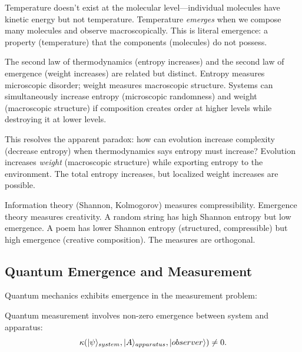\begin{interpretation}
Temperature doesn't exist at the molecular level---individual molecules have
kinetic energy but not temperature. Temperature \emph{emerges} when we compose
many molecules and observe macroscopically. This is literal emergence: a property
(temperature) that the components (molecules) do not possess.

The second law of thermodynamics (entropy increases) and the second law of
emergence (weight increases) are related but distinct. Entropy measures microscopic
disorder; weight measures macroscopic structure. Systems can simultaneously
increase entropy (microscopic randomness) and weight (macroscopic structure) if
composition creates order at higher levels while destroying it at lower levels.

This resolves the apparent paradox: how can evolution increase complexity
(decrease entropy) when thermodynamics says entropy must increase? Evolution
increases \emph{weight} (macroscopic structure) while exporting entropy to the
environment. The total entropy increases, but localized weight increases are
possible.

Information theory (Shannon, Kolmogorov) measures compressibility. Emergence
theory measures creativity. A random string has high Shannon entropy but low
emergence. A poem has lower Shannon entropy (structured, compressible) but high
emergence (creative composition). The measures are orthogonal.
\end{interpretation}

\subsection{Quantum Emergence and Measurement}

Quantum mechanics exhibits emergence in the measurement problem:

\begin{theorem}
\label{thm:quantum-measurement}
Quantum measurement involves non-zero emergence between system and apparatus:
\[
  \kappa(|\psi\rangle_{system}, |A\rangle_{apparatus}, |observer\rangle) \neq 0.
\]
\end{theorem}

